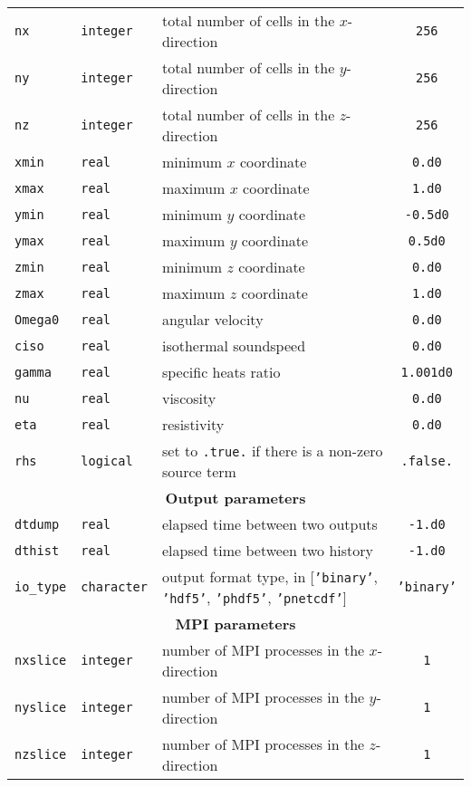 \documentclass[a4paper,12pt]{article}
\begin{document}
\begin{table}[h!]
{\begin{tabular}{l | l | p{} | c }
    \texttt{nx} & \texttt{integer} & total number of cells in the $x$-direction & \texttt{256} \\
    \texttt{ny} & \texttt{integer} & total number of cells in the $y$-direction & \texttt{256} \\
    \texttt{nz} & \texttt{integer} & total number of cells in the $z$-direction & \texttt{256} \\
    \texttt{xmin} & \texttt{real} & minimum $x$ coordinate & \texttt{0.d0} \\
    \texttt{xmax} & \texttt{real} & maximum $x$ coordinate & \texttt{1.d0} \\
    \texttt{ymin} & \texttt{real} & minimum $y$ coordinate & \texttt{-0.5d0} \\
    \texttt{ymax} & \texttt{real} & maximum $y$ coordinate & \texttt{0.5d0} \\
    \texttt{zmin} & \texttt{real} & minimum $z$ coordinate & \texttt{0.d0} \\
    \texttt{zmax} & \texttt{real} & maximum $z$ coordinate & \texttt{1.d0} \\
    \texttt{Omega0} & \texttt{real} & angular velocity & \texttt{0.d0} \\
    \texttt{ciso} & \texttt{real} & isothermal soundspeed & \texttt{0.d0} \\
    \texttt{gamma} & \texttt{real} & specific heats ratio & \texttt{1.001d0} \\
    \texttt{nu} & \texttt{real} & viscosity & \texttt{0.d0} \\
    \texttt{eta} & \texttt{real} & resistivity & \texttt{0.d0} \\
    \texttt{rhs} & \texttt{logical} & set to \texttt{.true.} if there is a non-zero source term & \texttt{.false.} \\
    \hline
    \multicolumn{4}{c}{\normalsize \bfseries Output parameters} \\
    \hline
    \texttt{dtdump} & \texttt{real} & elapsed time between two outputs & \texttt{-1.d0} \\
    \texttt{dthist} & \texttt{real} & elapsed time between two history & \texttt{-1.d0} \\
    \texttt{io\_type} & \texttt{character} & output format type, in [\texttt{'binary'}, \texttt{'hdf5'}, \texttt{'phdf5'}, \texttt{'pnetcdf'}] & \texttt{'binary'} \\
    \hline
    \multicolumn{4}{c}{\normalsize \bfseries MPI parameters} \\
    \hline
    \texttt{nxslice} & \texttt{integer} & number of MPI processes in the $x$-direction & \texttt{1} \\
    \texttt{nyslice} & \texttt{integer} & number of MPI processes in the $y$-direction & \texttt{1} \\
    \texttt{nzslice} & \texttt{integer} & number of MPI processes in the $z$-direction & \texttt{1} \\
    \hline
  \end{tabular}
  }
\end{table}
\clearpage
\end{document}
